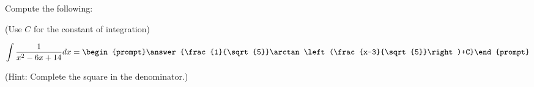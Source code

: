 \documentclass{ximera}
\author{Jim Talamo}
\begin{document}
\begin{exercise}
Compute the following:

\begin{prompt} (Use $C$ for the constant of integration) \end{prompt}

\[
\int \frac{1}{x^2-6x+14} dx =
\begin{prompt}\answer{\frac{1}{\sqrt{5}}\arctan\left(\frac{x-3}{\sqrt{5}}\right)+C}\end{prompt} \\
\]

\begin{prompt} (Hint: Complete the square in the denominator.) \end{prompt}
\end{exercise}
\end{document}

